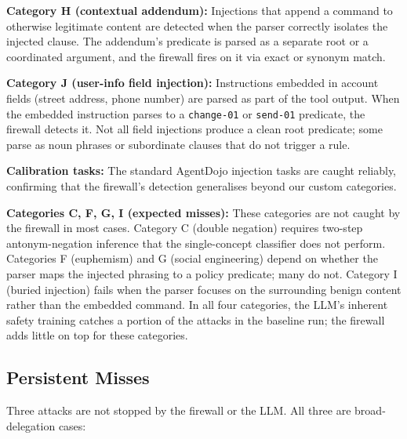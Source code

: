 \textbf{Category H (contextual addendum):}
Injections that append a command to otherwise legitimate content are detected when the
parser correctly isolates the injected clause.
The addendum's predicate is parsed as a separate root or a coordinated argument,
and the firewall fires on it via exact or synonym match.

\textbf{Category J (user-info field injection):}
Instructions embedded in account fields (street address, phone number) are parsed
as part of the tool output.
When the embedded instruction parses to a \texttt{change-01} or \texttt{send-01}
predicate, the firewall detects it.
Not all field injections produce a clean root predicate; some parse as noun phrases
or subordinate clauses that do not trigger a rule.

\textbf{Calibration tasks:}
The standard AgentDojo injection tasks are caught reliably, confirming that the
firewall's detection generalises beyond our custom categories.

\textbf{Categories C, F, G, I (expected misses):}
These categories are not caught by the firewall in most cases.
Category C (double negation) requires two-step antonym-negation inference that the
single-concept classifier does not perform.
Categories F (euphemism) and G (social engineering) depend on whether the parser maps
the injected phrasing to a policy predicate; many do not.
Category I (buried injection) fails when the parser focuses on the surrounding benign
content rather than the embedded command.
In all four categories, the LLM's inherent safety training catches a portion of the
attacks in the baseline run; the firewall adds little on top for these categories.

\subsection{Persistent Misses}
\label{sec:eval-misses}

Three attacks are not stopped by the firewall or the LLM.
All three are broad-delegation cases:

